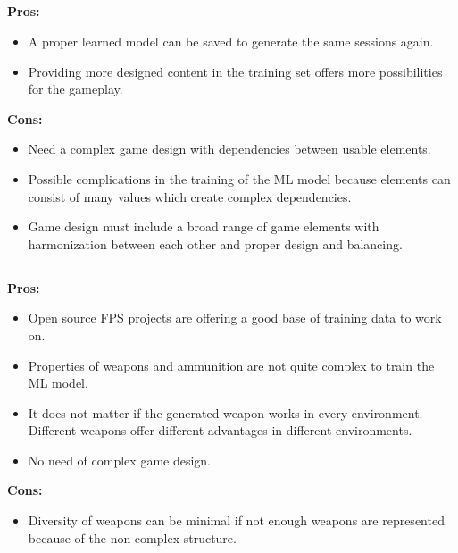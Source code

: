 \documentclass[MGS,Master,english]{twbook}%
\begin{document}
\subsection{}
\textbf{Pros:}
\begin{itemize}
	\item A proper learned model can be saved to generate the same sessions again.
	\item Providing more designed content in the training set offers more possibilities for the gameplay.
\end{itemize}
\textbf{Cons:}
\begin{itemize}
	\item Need a complex game design with dependencies between usable elements.
	\item Possible complications in the training of the ML model because elements can consist of many values which create complex dependencies.
	\item Game design must include a broad range of game elements with harmonization between each other and proper design and balancing.
\end{itemize}

\subsection{}
\textbf{Pros:}
\begin{itemize}
	\item Open source FPS projects are offering a good base of training data to work on.
	\item Properties of weapons and ammunition are not quite complex to train the ML model.
	\item It does not matter if the generated weapon works in every environment. Different weapons offer different advantages in different environments.
	\item No need of complex game design.
\end{itemize}
\textbf{Cons:}
\begin{itemize}
	\item Diversity of weapons can be minimal if not enough weapons are represented because of the non complex structure.
\end{itemize}
\end{document}
